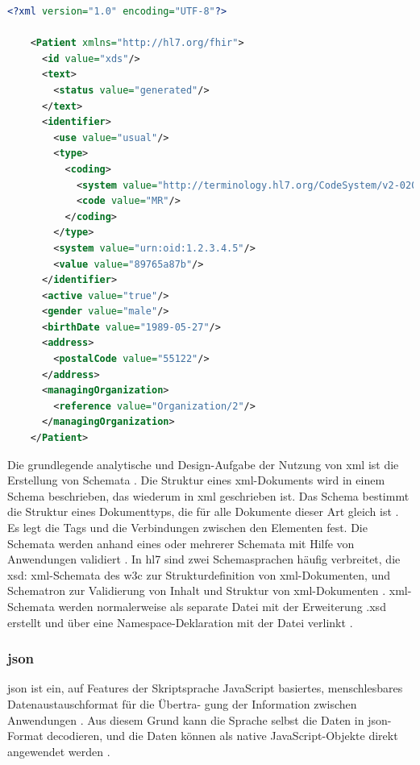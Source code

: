 \begin{lstlisting}[caption={[Beispiel einer \acs{fhir}-Ressource in XML] Beispiel einer \acs{fhir}-Ressource für eine Person in XML.},language=xml, label=list:xmlpatient, captionpos=b]
	<?xml version="1.0" encoding="UTF-8"?> 
	
	<Patient xmlns="http://hl7.org/fhir">
	  <id value="xds"/> 
	  <text> 
	    <status value="generated"/>
	  </text> 
	  <identifier> 
	    <use value="usual"/> 
 	    <type> 
	      <coding> 
	        <system value="http://terminology.hl7.org/CodeSystem/v2-0203"/> 
	        <code value="MR"/> 
	      </coding> 
	    </type> 
	    <system value="urn:oid:1.2.3.4.5"/> 
	    <value value="89765a87b"/> 
	  </identifier> 
	  <active value="true"/> 
	  <gender value="male"/> 
	  <birthDate value="1989-05-27"/> 
	  <address> 
	    <postalCode value="55122"/> 
	  </address> 
	  <managingOrganization> 
	    <reference value="Organization/2"/> 
	  </managingOrganization> 
	</Patient>
\end{lstlisting}

Die grundlegende analytische und Design-Aufgabe der Nutzung von \ac{xml} ist die Erstellung von Schemata \cite{grundinfo}. Die Struktur eines \ac{xml}-Dokuments wird in einem Schema beschrieben, das wiederum in \ac{xml} geschrieben ist. Das Schema bestimmt die Struktur eines Dokumenttyps, die für alle Dokumente dieser Art gleich ist \cite{interop, grundinfo}. Es legt die Tags und die Verbindungen zwischen den Elementen fest. Die Schemata werden anhand eines oder mehrerer Schemata mit Hilfe von Anwendungen validiert \cite{grundinfo}. In \ac{hl7} sind zwei Schemasprachen häufig verbreitet, die \ac{xsd}: \ac{xml}-Schemata des \ac{w3c} zur Strukturdefinition von \ac{xml}-Dokumenten, und Schematron zur Validierung von Inhalt und Struktur von \ac{xml}-Dokumenten \cite{interop}. \ac{xml}-Schemata werden normalerweise als separate Datei mit der Erweiterung .xsd erstellt und über eine Namespace-Deklaration mit der Datei verlinkt \cite{interop}.

\subsubsection{\acs{json}} \label{subsubsec:json}

\acf{json} ist ein, auf Features der Skriptsprache JavaScript basiertes, menschlesbares Datenaustauschformat für die Übertra- gung der Information zwischen Anwendungen \cite{jsondef}. Aus diesem Grund kann die Sprache selbst die Daten in \ac{json}-Format decodieren, und die Daten können als native JavaScript-Objekte direkt angewendet werden \cite{interop}. 

